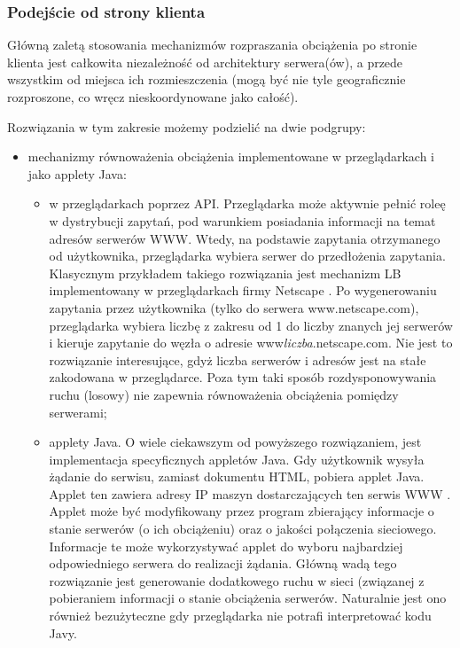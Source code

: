 \subsubsection{Podejście od strony klienta}

Główną zaletą stosowania mechanizmów rozpraszania obciążenia po stronie klienta jest całkowita niezależność od architektury 
serwera(ów), a przede wszystkim od miejsca ich rozmieszczenia (mogą być nie tyle geograficznie rozproszone, co wręcz 
nieskoordynowane jako całość). 

Rozwiązania w tym zakresie możemy podzielić na dwie podgrupy:
\begin{itemize}
\item mechanizmy równoważenia obciążenia implementowane w przeglądarkach i jako applety Java:
\begin{itemize}
\item w przeglądarkach poprzez API. Przeglądarka może aktywnie pełnić roleę w dystrybucji zapytań, pod warunkiem posiadania
informacji na temat adresów serwerów WWW. Wtedy, na podstawie zapytania otrzymanego od użytkownika, przeglądarka wybiera
serwer do przedłożenia zapytania. Klasycznym przykładem takiego rozwiązania jest mechanizm LB implementowany w przeglądarkach
firmy Netscape \cite{gliwice16,gliwice17}. Po wygenerowaniu zapytania przez użytkownika (tylko do serwera 
www.netscape.com), przeglądarka wybiera liczbę z zakresu od 1 do liczby znanych jej serwerów i kieruje zapytanie do węzła
o adresie www\emph{liczba}.netscape.com. Nie jest to rozwiązanie interesujące, gdyż liczba serwerów i adresów jest na stałe 
zakodowana w przeglądarce. Poza tym taki sposób rozdysponowywania ruchu (losowy) nie zapewnia równoważenia obciążenia pomiędzy
serwerami;
\item applety Java. O wiele ciekawszym od powyższego rozwiązaniem, jest implementacja specyficznych appletów Java. Gdy
użytkownik wysyła żądanie do serwisu, zamiast dokumentu HTML, pobiera applet Java. Applet ten zawiera adresy IP maszyn 
dostarczających ten serwis WWW \cite{gliwice18,gliwice19}. Applet może być modyfikowany przez program zbierający informacje o 
stanie serwerów (o ich obciążeniu) oraz o jakości połączenia sieciowego. Informacje te może wykorzystywać applet do
wyboru najbardziej odpowiedniego serwera do realizacji żądania. Główną wadą tego rozwiązanie jest generowanie 
dodatkowego ruchu w sieci (związanej z pobieraniem informacji o stanie obciążenia serwerów. Naturalnie jest ono również 
bezużyteczne gdy przeglądarka nie potrafi interpretować kodu Javy.
\end{itemize}

\end{itemize}
